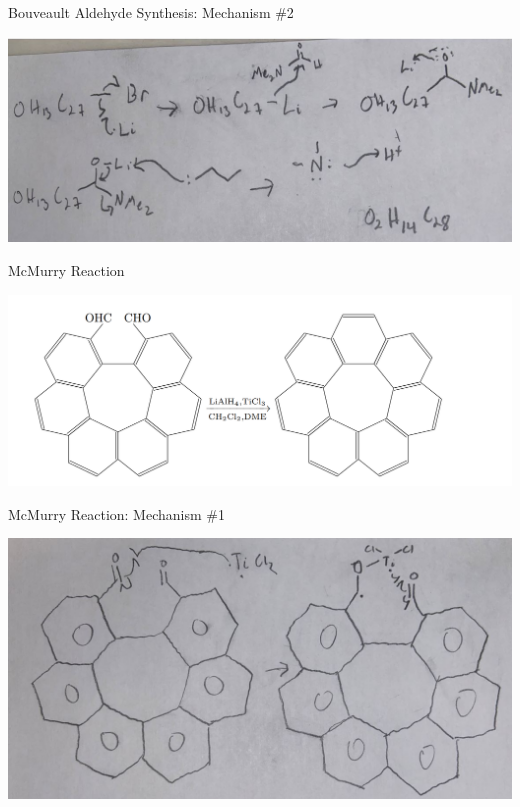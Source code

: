 \documentclass[notes]{beamer}
\begin{document}
\begin{frame}{Bouveault Aldehyde Synthesis: Mechanism \#2}
\begin{center}
    \includegraphics[scale=.37]{bouveault_aldehyde_sythesis_tow.JPG}
\end{center}
\end{frame}

\begin{frame}{McMurry Reaction}
\begin{center}
    \includegraphics[scale=.45]{mcmurry_reaction_overall.PNG}
\end{center}
\end{frame}

\begin{frame}{McMurry Reaction: Mechanism \#1}
\begin{center}
    \includegraphics[scale=.35]{mcmurry_reaction_one.JPG}
\end{center}
\end{frame}
\end{document}
